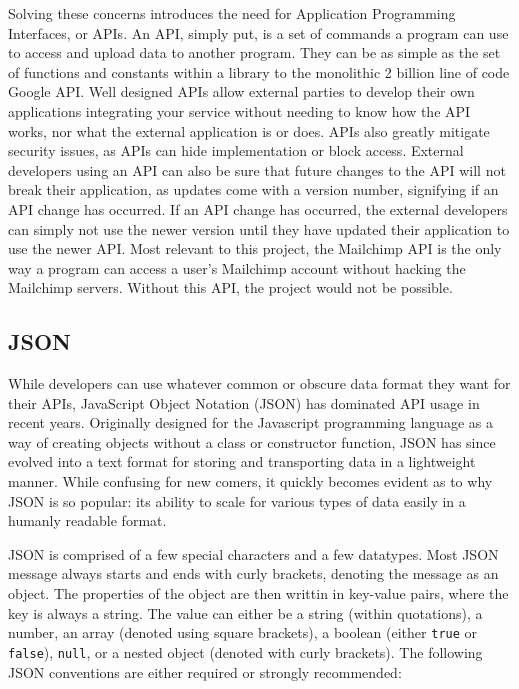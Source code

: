 \documentclass[11pt]{article}
\begin{document}
Solving these concerns introduces the need for Application Programming Interfaces, or APIs. An API, simply put, is a set of commands a program can use to access and upload data to another program. They can be as simple as the set of functions and constants within a library to the monolithic 2 billion line of code Google API. Well designed APIs allow external parties to develop their own applications integrating your service without needing to know how the API works, nor what the external application is or does. APIs also greatly mitigate security issues, as APIs can hide implementation or block access. External developers using an API can also be sure that future changes to the API will not break their application, as updates come with a version number, signifying if an API change has occurred. If an API change has occurred, the external developers can simply not use the newer version until they have updated their application to use the newer API. Most relevant to this project, the Mailchimp API is the only way a program can access a user's Mailchimp account without hacking the Mailchimp servers. Without this API, the project would not be possible.

\subsection{JSON}

While developers can use whatever common or obscure data format they want for their APIs, JavaScript Object Notation (JSON) has dominated API usage in recent years. Originally designed for the Javascript programming language as a way of creating objects without a class or constructor function, JSON has since evolved into a text format for storing and transporting data in a lightweight manner. While confusing for new comers, it quickly becomes evident as to why JSON is so popular: its ability to scale for various types of data easily in a humanly readable format.

JSON is comprised of a few special characters and a few datatypes. Most JSON message always starts and ends with curly brackets, denoting the message as an object. The properties of the object are then writtin in key-value pairs, where the key is always a string. The value can either be a string (within quotations), a number, an array (denoted using square brackets), a boolean (either \texttt{true} or \texttt{false}), \texttt{null}, or a nested object (denoted with curly brackets). The following JSON conventions are either required or strongly recommended:
\end{document}
